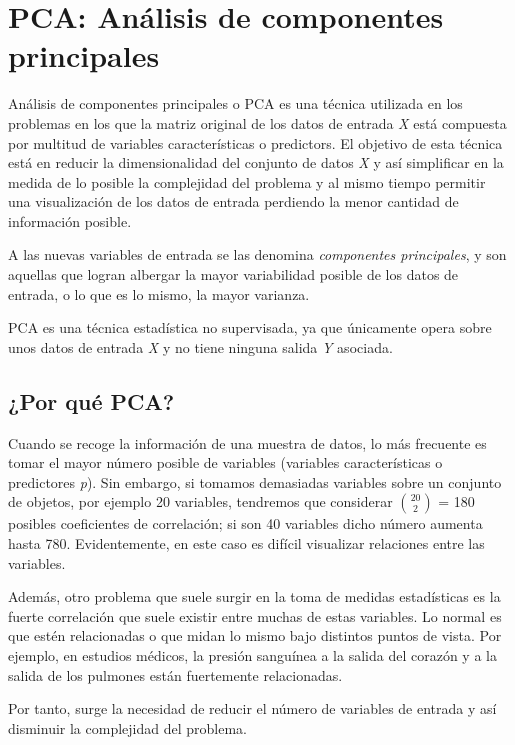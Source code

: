 \documentclass[12pt,a4paper,Spanish]{book}
\begin{document}
\chapter{PCA: Análisis de componentes principales}

Análisis de componentes principales o PCA es una técnica utilizada en los problemas en los que la matriz original de los datos de entrada \textit{X} está compuesta por multitud de variables características o predictors. El objetivo de esta técnica está en reducir la dimensionalidad del conjunto de datos \textit{X} y así simplificar en la medida de lo posible la complejidad del problema y al mismo tiempo permitir una visualización de los datos de entrada perdiendo la menor cantidad de información posible.

A las nuevas variables de entrada se las denomina \textit{componentes principales}, y son aquellas que logran albergar la mayor variabilidad posible de los datos de entrada, o lo que es lo mismo, la mayor varianza.

PCA es una técnica estadística no supervisada, ya que únicamente opera sobre unos datos de entrada \textit{X} y no tiene ninguna salida \textit{Y} asociada. 


\section{¿Por qué PCA?}

Cuando se recoge la información de una muestra de datos, lo más frecuente es tomar el
mayor número posible de variables (variables características o predictores \textit{p}). Sin embargo, si tomamos demasiadas variables sobre
un conjunto de objetos, por ejemplo 20 variables, tendremos que considerar $20 \choose 2$ = 180 
posibles coeficientes de correlación; si son 40 variables dicho número aumenta hasta 780.
Evidentemente, en este caso es difícil visualizar relaciones entre las variables.

Además, otro problema que suele surgir en la toma de medidas estadísticas es la fuerte correlación que suele existir entre muchas de estas variables. Lo normal es que estén relacionadas o que midan lo mismo bajo distintos puntos de vista. Por ejemplo, en
estudios médicos, la presión sanguínea a la salida del corazón y a la salida de los pulmones
están fuertemente relacionadas. 

Por tanto, surge la necesidad de reducir el número de variables de entrada y así disminuir la complejidad del problema.
\end{document}
